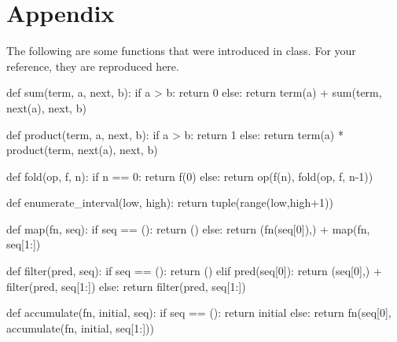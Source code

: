 \newpage
\section{Appendix}
The following are some functions that were introduced in class. For your reference, they are
reproduced here.
\begin{python}
def sum(term, a, next, b):
    if a > b:
        return 0
    else:
        return term(a) + sum(term, next(a), next, b)

def product(term, a, next, b):
    if a > b:
        return 1
    else:
        return term(a) * product(term, next(a), next, b)

def fold(op, f, n):
    if n == 0:
        return f(0)
    else:
        return op(f(n), fold(op, f, n-1))

def enumerate_interval(low, high):
    return tuple(range(low,high+1))

def map(fn, seq):
    if seq == ():
        return ()
    else:
        return (fn(seq[0]),) + map(fn, seq[1:])

def filter(pred, seq):
    if seq == ():
        return ()
    elif pred(seq[0]):
        return (seq[0],) + filter(pred, seq[1:])
    else:
        return filter(pred, seq[1:])

def accumulate(fn, initial, seq):
    if seq == ():
        return initial
    else:
        return fn(seq[0], accumulate(fn, initial, seq[1:]))
\end{python}

